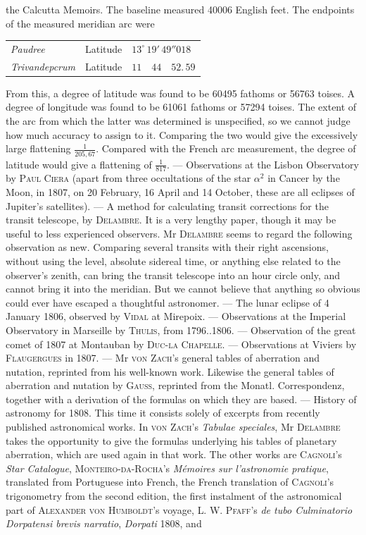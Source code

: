 the Calcutta Memoirs. The baseline measured 40006 English feet. The endpoints of the measured meridian arc were

\begin{center}\begin{tabular}{@{}lll@{}}\emph{Paudree} & Latitude & $13^\circ\,19'\,49''018$ \\ \emph{Trivandepcrum} & Latitude & $11\quad44\quad52.\,59$ \\ \end{tabular}\end{center}
\noindent From this, a degree of latitude was found to be 60495 fathoms or 56763 toises. A degree of longitude was found to be 61061 fathoms or 57294 toises. The extent of the arc from which the latter was determined is unspecified, so we cannot judge how much accuracy to assign to it. Comparing the two would give the excessively large flattening $\frac{1}{205,67}$. Compared with the French arc measurement, the degree of latitude would give a flattening of $\frac{1}{817}$. — Observations at the Lisbon Observatory by \textsc{Paul Ciera} (apart from three occultations of the star $\alpha^2$ in Cancer by the Moon, in 1807, on 20 February, 16 April and 14 October, these are all eclipses of Jupiter’s satellites). — A method for calculating transit corrections for the transit telescope, by \textsc{Delambre}. It is a very lengthy paper, though it may be useful to less experienced observers. Mr \textsc{Delambre} seems to regard the following observation as new. Comparing several transits with their right ascensions, without using the level, absolute sidereal time, or anything else related to the observer’s zenith, can bring the transit telescope into an hour circle only, and cannot bring it into the meridian. But we cannot believe that anything so obvious could ever have escaped a thoughtful astronomer. — The lunar eclipse of 4 January 1806, observed by \textsc{Vidal} at Mirepoix. — Observations at the Imperial Observatory in Marseille by \textsc{Thulis}, from 1796..1806. — Observation of the great comet of 1807 at Montauban by \textsc{Duc-la Chapelle}. — Observations at Viviers by \textsc{Flaugergues} in 1807. — Mr \textsc{von Zach}’s general tables of aberration and nutation, reprinted from his well-known work. Likewise the general tables of aberration and nutation by \textsc{Gauss}, reprinted from the Monatl. Correspondenz, together with a derivation of the formulas on which they are based. — History of astronomy for 1808. This time it consists solely of excerpts from recently published astronomical works. In \textsc{von Zach}’s \emph{Tabulae speciales}, Mr \textsc{Delambre} takes the opportunity to give the formulas underlying his tables of planetary aberration, which are used again in that work. The other works are \textsc{Cagnoli}’s \emph{Star Catalogue}, \textsc{Monteiro-da-Rocha}’s \emph{Mémoires sur l'astronomie pratique}, translated from Portuguese into French, the French translation of \textsc{Cagnoli}’s trigonometry from the second edition, the first instalment of the astronomical part of \textsc{Alexander von Humboldt}’s voyage, \textsc{L. W. Pfaff}’s \emph{de tubo Culminatorio Dorpatensi brevis narratio}, \emph{Dorpati} 1808, and 